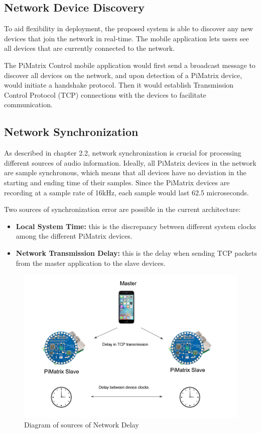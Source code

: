 \documentclass[hidelinks,12pt]{report} %
\begin{document}
\subsection{Network Device Discovery}

To aid flexibility in deployment, the proposed system is able to discover any new devices that join the network in real-time. The mobile application lets users see all devices that are currently connected to the network. 

The PiMatrix Control mobile application would first send a broadcast message to discover all devices on the network, and upon detection of a PiMatrix device, would initiate a handshake protocol. Then it would establish Transmission Control Protocol (TCP) connections with the devices to facilitate communication. 

\subsection{Network Synchronization}

As described in chapter 2.2, network synchronization is crucial for processing different sources of audio information. Ideally, all PiMatrix devices in the network are sample synchronous, which means that all devices have no deviation in the starting and ending time of their samples. Since the PiMatrix devices are recording at a sample rate of 16kHz, each sample would last 62.5 microseconds. 

Two sources of synchronization error are possible in the current architecture:

	\begin{itemize}
		\item{\textbf{Local System Time: }}
		this is the discrepancy between different system clocks among the different PiMatrix devices. 
	
		\item{\textbf{Network Transmission Delay: }}
		this is the delay when sending TCP packets from the master application to the slave devices. 
	
		
	\end{itemize}

\begin{figure}[h]
\centering
\includegraphics[scale = 1.0]{fig3.4} 
\caption{Diagram of sources of Network Delay}
\label{fig}
\end{figure}
\end{document}
